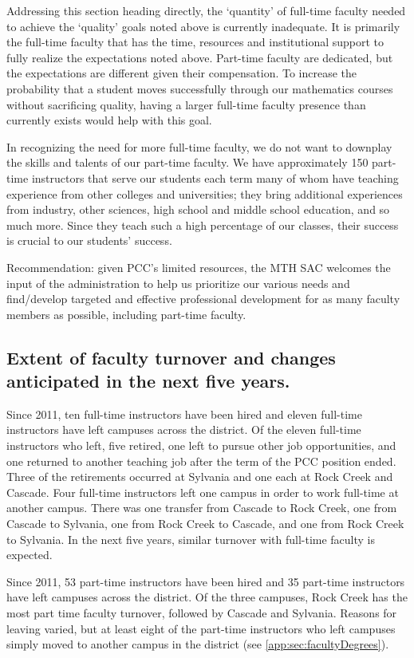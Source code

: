 Addressing this section heading directly, the `quantity' of full-time faculty
needed to achieve the `quality' goals noted above is currently inadequate.  It
is primarily the full-time faculty that has the time, resources and
institutional support to fully realize the expectations noted above.  Part-time
faculty are dedicated, but the expectations are different given their
compensation.   To increase the probability that a student moves successfully
through our mathematics courses without sacrificing quality, having a larger
full-time faculty presence than currently exists would help with this goal.

In recognizing the need for more full-time faculty, we do not want to downplay
the skills and talents of our part-time faculty.  We have approximately 150
part-time instructors that serve our students each term many of whom have
teaching experience from other colleges and universities; they bring additional
experiences from industry, other sciences, high school and middle school
education, and so much more.  Since they teach such a high percentage of our
classes, their success is crucial to our students' success.

Recommendation:  given PCC's limited resources, the MTH SAC welcomes the input
of the administration to help us prioritize our various needs and find/develop
targeted and effective professional development for as many faculty members as
possible, including part-time faculty.  

\subsection{Extent of faculty turnover and changes anticipated in the next five
years.} 
Since 2011, ten full-time instructors have been hired and eleven full-time
instructors have left campuses across the district.  Of the eleven full-time
instructors who left, five retired, one left to pursue other job opportunities,
and one returned to another teaching job after the term of the PCC position
ended.  Three of the retirements occurred at Sylvania and one each at Rock
Creek and Cascade.  Four full-time instructors left one campus in order to work
full-time at another campus.   There was one transfer from Cascade to Rock
Creek, one from Cascade to Sylvania, one from Rock Creek to Cascade, and one
from Rock Creek to Sylvania.  In the next five years, similar turnover with
full-time faculty is expected.

Since 2011, 53 part-time instructors have been hired and 35 part-time
instructors have left campuses across the district.  Of the three campuses,
Rock Creek has the most part time faculty turnover, followed by Cascade and
Sylvania.  Reasons for leaving varied, but at least eight of the part-time
instructors who left campuses simply moved to another campus in the district
(see \vref{app:sec:facultyDegrees}).

